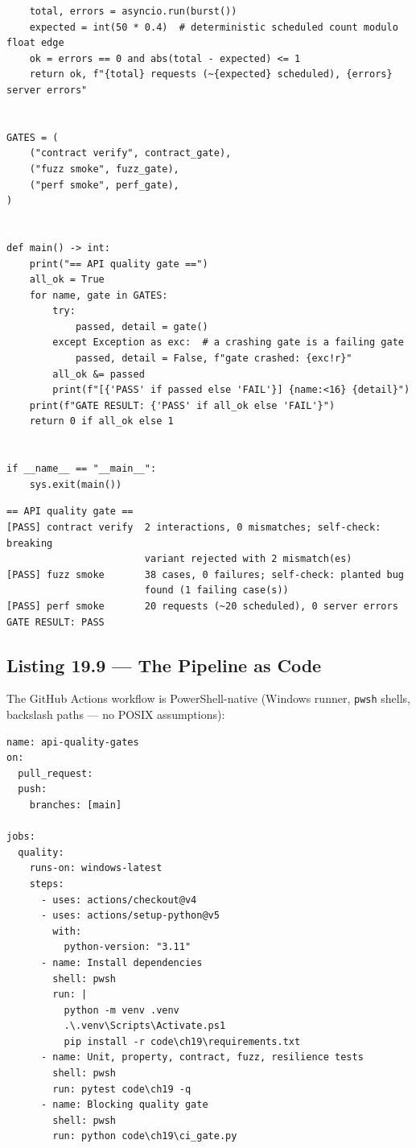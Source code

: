 \begin{verbatim}
    total, errors = asyncio.run(burst())
    expected = int(50 * 0.4)  # deterministic scheduled count modulo float edge
    ok = errors == 0 and abs(total - expected) <= 1
    return ok, f"{total} requests (~{expected} scheduled), {errors} server errors"


GATES = (
    ("contract verify", contract_gate),
    ("fuzz smoke", fuzz_gate),
    ("perf smoke", perf_gate),
)


def main() -> int:
    print("== API quality gate ==")
    all_ok = True
    for name, gate in GATES:
        try:
            passed, detail = gate()
        except Exception as exc:  # a crashing gate is a failing gate
            passed, detail = False, f"gate crashed: {exc!r}"
        all_ok &= passed
        print(f"[{'PASS' if passed else 'FAIL'}] {name:<16} {detail}")
    print(f"GATE RESULT: {'PASS' if all_ok else 'FAIL'}")
    return 0 if all_ok else 1


if __name__ == "__main__":
    sys.exit(main())
\end{verbatim}

\begin{verbatim}
== API quality gate ==
[PASS] contract verify  2 interactions, 0 mismatches; self-check: breaking
                        variant rejected with 2 mismatch(es)
[PASS] fuzz smoke       38 cases, 0 failures; self-check: planted bug
                        found (1 failing case(s))
[PASS] perf smoke       20 requests (~20 scheduled), 0 server errors
GATE RESULT: PASS
\end{verbatim}

\subsection{Listing 19.9 --- The Pipeline as Code}
\label{sec:ch19-listing-yaml}

The GitHub Actions workflow is PowerShell-native (Windows runner,
\texttt{pwsh} shells, backslash paths --- no POSIX assumptions):

\begin{verbatim}
name: api-quality-gates
on:
  pull_request:
  push:
    branches: [main]

jobs:
  quality:
    runs-on: windows-latest
    steps:
      - uses: actions/checkout@v4
      - uses: actions/setup-python@v5
        with:
          python-version: "3.11"
      - name: Install dependencies
        shell: pwsh
        run: |
          python -m venv .venv
          .\.venv\Scripts\Activate.ps1
          pip install -r code\ch19\requirements.txt
      - name: Unit, property, contract, fuzz, resilience tests
        shell: pwsh
        run: pytest code\ch19 -q
      - name: Blocking quality gate
        shell: pwsh
        run: python code\ch19\ci_gate.py
\end{verbatim}

